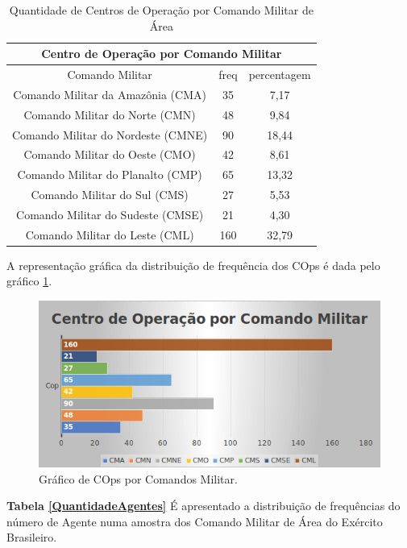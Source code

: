 \begin{table}[H]
\centering
\begin{tabular}{|c | c| c|} 
 \multicolumn{3}{c}{Centro de Operação por Comando Militar}\\ \hline
  Comando Militar & freq  & percentagem \\ [0.5ex] 
 \hline
 Comando Militar da Amazônia (CMA) & 35 & 7,17 \\ 
 \hline
 Comando Militar do Norte (CMN) & 48 & 9,84\\
 \hline
 Comando Militar do Nordeste (CMNE) &  90 & 18,44\\
 \hline
 Comando Militar do Oeste (CMO) & 42 & 8,61\\
 \hline
 Comando Militar do Planalto (CMP) &  65 & 13,32\\
 \hline
 Comando Militar do Sul (CMS) &  27 & 5,53\\
 \hline
 Comando Militar do Sudeste (CMSE) &  21 & 4,30\\
 \hline
 Comando Militar do Leste (CML) &  160 & 32,79\\ [1ex] 
 \hline
\end{tabular}
\caption{Quantidade de Centros de Operação por Comando Militar de Área}
\label{QuantidadeCops}
\end{table}

A representação gráfica da distribuição de frequência dos COps é dada pelo gráfico \ref{figuraCops}.
\begin{figure}[H]
        \centering
        \includegraphics[width=1\textwidth]{Figuras/qtde_cops.png}
        \caption{Gráfico de COps por Comandos Militar.}
        \label{figuraCops}
\end{figure}

\textbf{Tabela \ref{QuantidadeAgentes}} É apresentado a distribuição de frequências do número de Agente numa amostra dos Comando Militar de Área do Exército Brasileiro. 

